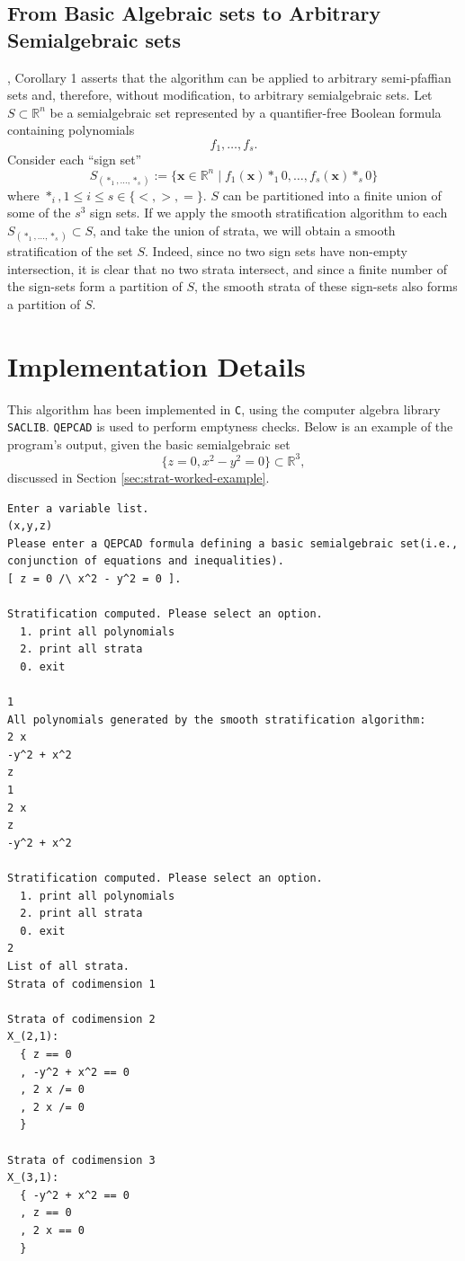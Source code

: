 \documentclass[
]{book}
\theoremstyle{definition}
\theoremstyle{definition}
\theoremstyle{definition}
\theoremstyle{definition}
\theoremstyle{remark}
\begin{document}
\hypertarget{sec:strat-semialgebraic}{%
\subsection{From Basic Algebraic sets to Arbitrary Semialgebraic sets}\label{sec:strat-semialgebraic}}

\citet{gv1995}, Corollary 1 asserts that the algorithm can be applied to arbitrary semi-pfaffian sets and, therefore, without modification, to arbitrary semialgebraic sets.
Let \(S \subset \mathbb{R}^n\) be a semialgebraic set represented by a quantifier-free Boolean formula containing polynomials
\[
f_1,\ldots,f_s.
\]
Consider each ``sign set''
\[
S_{( \ast_1,\ldots,\ast_s )} := \{ \mathbf{x} \in \mathbb{R}^n \mid f_1(\mathbf{x}) \ast_1 0, \ldots, f_s(\mathbf{x}) \ast_s 0 \}
\]
where \(\ast_i, 1 \le i \le s \in \{<, >, =\}\). \(S\) can be partitioned into a finite union of some of the \(s^3\) sign sets.
If we apply the smooth stratification algorithm to each \(S_{(\ast_1,\ldots,\ast_s)} \subset S\), and take the union of strata, we will obtain a smooth stratification of the set \(S\). Indeed, since no two sign sets have non-empty intersection, it is clear that no two strata intersect, and since a finite number of the sign-sets form a partition of \(S\), the smooth strata of these sign-sets also forms a partition of \(S\).

\hypertarget{implementation-details}{%
\section{Implementation Details}\label{implementation-details}}

This algorithm has been implemented in \texttt{C}, using the computer algebra library \texttt{SACLIB}. \texttt{QEPCAD} is used to perform emptyness checks. Below is an example of the program's output, given the basic semialgebraic set
\[
\{ z = 0, x^2 - y^2 = 0 \} \subset \mathbb{R}^3,
\]
discussed in Section \ref{sec:strat-worked-example}.

\begin{verbatim}
Enter a variable list.
(x,y,z)
Please enter a QEPCAD formula defining a basic semialgebraic set(i.e., conjunction of equations and inequalities).
[ z = 0 /\ x^2 - y^2 = 0 ].

Stratification computed. Please select an option.
  1. print all polynomials
  2. print all strata
  0. exit

1
All polynomials generated by the smooth stratification algorithm:
2 x
-y^2 + x^2
z
1
2 x
z
-y^2 + x^2

Stratification computed. Please select an option.
  1. print all polynomials
  2. print all strata
  0. exit
2
List of all strata.
Strata of codimension 1

Strata of codimension 2
X_(2,1):
  { z == 0
  , -y^2 + x^2 == 0
  , 2 x /= 0
  , 2 x /= 0
  }

Strata of codimension 3
X_(3,1):
  { -y^2 + x^2 == 0
  , z == 0
  , 2 x == 0
  }
\end{verbatim}
\end{document}
